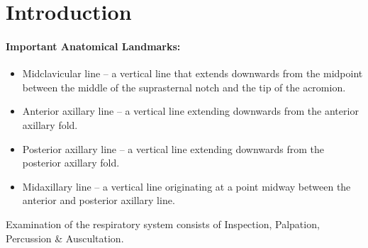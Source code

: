 \documentclass[a4paper,12pt,openany,twoside]{book}
\begin{document}
															\section*{Introduction}


															\paragraph{Important Anatomical Landmarks:}
															\begin{itemize}
																	\itemsep0em
\item{Midclavicular line – a vertical line that extends downwards from the midpoint between the middle of the suprasternal notch and the tip of the acromion.}
\item{Anterior axillary line – a vertical line extending downwards from the anterior axillary fold.}
\item{Posterior axillary line – a vertical line extending downwards from the posterior axillary fold.}
\item{Midaxillary line – a vertical line originating at a point midway between the anterior and posterior axillary line.}
															\end{itemize}
															\par
Examination of the respiratory system consists of Inspection, Palpation, Percussion \& Auscultation.
\end{document}
